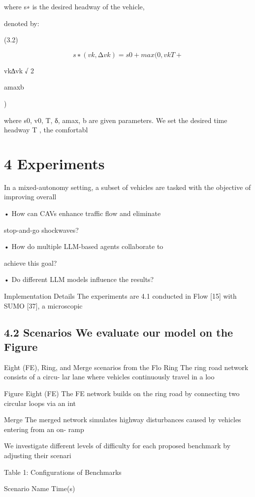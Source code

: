 \documentclass[12pt]{article}
\begin{document}
where s∗ is the desired headway of the vehicle,


denoted by:


(3.2)


\begin{equation}
s∗(vk, ∆vk) = s0 + max(0, vkT +
\end{equation}


vk∆vk
√
2


amaxb


)


where s0, v0, T, δ, amax, b are given parameters. We
set the desired time headway T , the comfortabl


\section{4 Experiments}


In a mixed-autonomy setting, a subset of vehicles are
tasked with the objective of improving overall


• How can CAVs enhance traffic flow and eliminate


stop-and-go shockwaves?


• How do multiple LLM-based agents collaborate to


achieve this goal?


• Do different LLM models influence the results?


Implementation Details The experiments are
4.1
conducted in Flow [15] with SUMO [37], a microscopic



\subsection{4.2 Scenarios We evaluate our model on the Figure}

Eight (FE), Ring, and Merge scenarios from the Flo
Ring The ring road network consists of a circu-
lar lane where vehicles continuously travel in a loo


Figure Eight (FE) The FE network builds on
the ring road by connecting two circular loops via an
int


Merge The merged network simulates highway
disturbances caused by vehicles entering from an on-
ramp


We investigate different levels of difficulty for each
proposed benchmark by adjusting their scenari


Table 1: Configurations of Benchmarks


Scenario Name Time(s)
\end{document}
